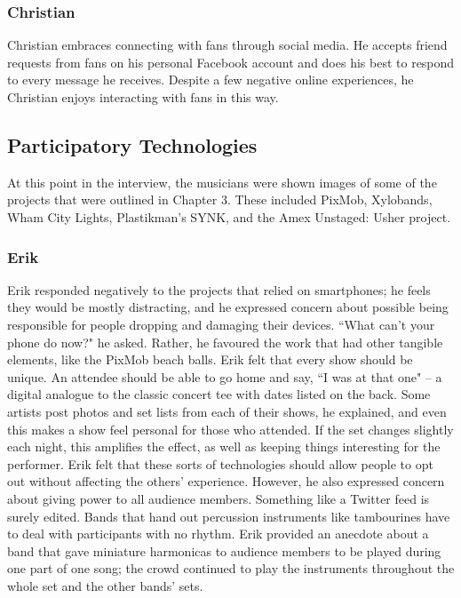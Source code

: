 \subsubsection{Christian}
Christian embraces connecting with fans through social media. He accepts friend requests from fans on his personal Facebook account and does his best to respond to every message he receives. Despite a few negative online experiences, he Christian enjoys interacting with fans in this way.

\subsection{Participatory Technologies}

At this point in the interview, the musicians were shown images of some of the projects that were outlined in Chapter 3. These included PixMob, Xylobands, Wham City Lights, Plastikman's SYNK, and the Amex Unstaged: Usher project.

\subsubsection{Erik}
Erik responded negatively to the projects that relied on smartphones; he feels they would be mostly distracting, and he expressed concern about possible being responsible for people dropping and damaging their devices. ``What can't your phone do now?" he asked. Rather, he favoured the work that had other tangible elements, like the PixMob beach balls. Erik felt that every show should be unique. An attendee should be able to go home and say, ``I was at that one" -- a digital analogue to the classic concert tee with dates listed on the back. Some artists post photos and set lists from each of their shows, he explained, and even this makes a show feel personal for those who attended. If the set changes slightly each night, this amplifies the effect, as well as keeping things interesting for the performer. Erik felt that these sorts of technologies should allow people to opt out without affecting the others' experience. However, he also expressed concern about giving power to all audience members. Something like a Twitter feed is surely edited. Bands that hand out percussion instruments like tambourines have to deal with participants with no rhythm. Erik provided an anecdote about a band that gave miniature harmonicas to audience members to be played during one part of one song; the crowd continued to play the instruments throughout the whole set and the other bands' sets.

